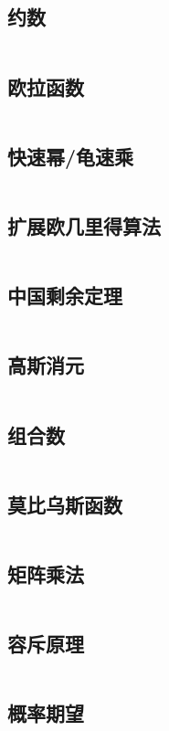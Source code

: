 \documentclass[a4paper,12pt]{article}
\begin{document}
\subsection{约数}
\inputminted[breaklines, linenos]{c++}{math/yueshu.cc}
\subsection{欧拉函数}
\inputminted[breaklines, linenos]{c++}{math/eluer.cc}
\subsection{快速幂/龟速乘}
\inputminted[breaklines, linenos]{c++}{math/qmi.cc}
\subsection{扩展欧几里得算法}
\inputminted[breaklines, linenos]{c++}{math/exgcd.cc}
\subsection{中国剩余定理}
\inputminted[breaklines, linenos]{c++}{math/crt.cc}
\subsection{高斯消元}
\inputminted[breaklines, linenos]{c++}{math/gauss.cc}
\subsection{组合数}
\inputminted[breaklines, linenos]{c++}{math/combine.cc}
\subsection{莫比乌斯函数}
\inputminted[breaklines, linenos]{c++}{math/mobius.cc}
\subsection{矩阵乘法}
\inputminted[breaklines, linenos]{c++}{math/matrix.cc}
\subsection{容斥原理}
\inputminted[breaklines, linenos]{c++}{math/rongchi.cc}
\subsection{概率期望}
\inputminted[breaklines, linenos]{c++}{math/qiwang.cc}
\end{document}
